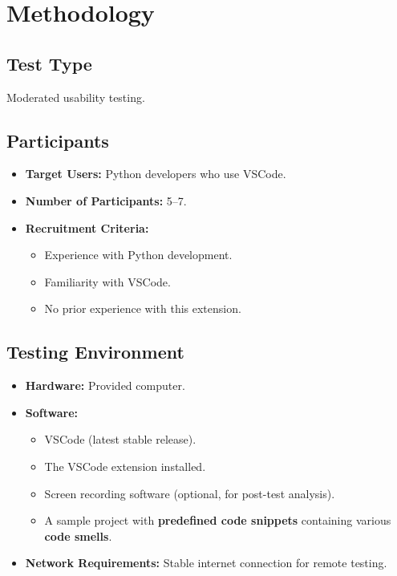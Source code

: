 \documentclass[12pt, titlepage]{article}
\begin{document}
\section*{Methodology}
\subsection*{Test Type}
Moderated usability testing.

\subsection*{Participants}
\begin{itemize}
  \item \textbf{Target Users:} Python developers who use VSCode.
  \item \textbf{Number of Participants:} 5–7.
  \item \textbf{Recruitment Criteria:}
    \begin{itemize}
      \item Experience with Python development.
      \item Familiarity with VSCode.
      \item No prior experience with this extension.
    \end{itemize}
\end{itemize}

\subsection*{Testing Environment}
\begin{itemize}
  \item \textbf{Hardware:} Provided computer.
  \item \textbf{Software:}
    \begin{itemize}
      \item VSCode (latest stable release).
      \item The VSCode extension installed.
      \item Screen recording software (optional, for post-test analysis).
      \item A sample project with \textbf{predefined code snippets}
        containing various \textbf{code smells}.
    \end{itemize}
  \item \textbf{Network Requirements:} Stable internet connection for
    remote testing.
\end{itemize}
\end{document}
